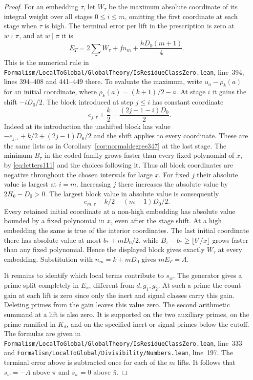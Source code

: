 \documentclass[a4paper,11pt]{article}
\theoremstyle{definition}
\theoremstyle{remark}
\newcommand{\srcloc}[2]{{\small\nolinkurl{#1.lean}}, line~#2}
\numberwithin{equation}{section}
\begin{document}
\begin{proof}
For an embedding \(\tau\), let \(W_\tau\) be the maximum
absolute coordinate of its integral weight over all stages
\(0\le i\le m\), omitting the first coordinate at each stage
when \(\tau\) is high. The terminal error per lift in the
prescription is zero at \(w\nmid\pi\), and at \(w\mid\pi\)
it is
\[
 E_T=2\sum_\tau W_\tau+f n_m+\frac{hD_0(m+1)}4 .
\]
This is the numerical rule in
\srcloc{Formalism/LocalToGlobal/GlobalTheory/IsResidueClassZero}{394},
lines 394--408 and 441--449 there. To evaluate the maximum,
write \(u_a-\rho_k(a)\) for an initial coordinate, where
\(\rho_k(a)=(k+1)/2-a\). At stage \(i\) it gains the shift
\(-iD_0/2\). The block introduced at step \(j\le i\) has
constant coordinate
\[
       -e_{j,\tau}+\frac{k}{2}
                      +\frac{(2j-1-i)D_0}{2}.
\]
Indeed at its introduction the unshifted block has value
\(-e_{j,\tau}+k/2+(2j-1)D_0/2\) and the shift applies to
every coordinate. These are the same lists as in
Corollary~\ref{cor:normaldegree347} at the last stage.
The minimum \(B_\tau\) in the coded family grows faster than
every fixed polynomial of \(x\), by \eqref{eq:letters111} and
the choices following it. Thus all block coordinates are negative
throughout the chosen intervals for large \(x\). For fixed \(j\)
their absolute value is largest at \(i=m\). Increasing \(j\)
there increases the absolute value by \(2H_0-D_0>0\). The
largest block value in absolute value is consequently
\[
                     e_{m,\tau}-k/2-(m-1)D_0/2 .
\]
Every retained initial coordinate at a non-high embedding has
absolute value bounded by a fixed polynomial in \(x\), even
after the stage shift. At a high embedding the same is true of
the interior coordinates. The last initial coordinate there
has absolute value at most \(b_*+mD_0/2\), while
\(B_\tau-b_*\ge\lfloor b'/x\rfloor\) grows faster than any
fixed polynomial. Hence the displayed block gives exactly
\(W_\tau\) at every embedding. Substitution with \(n_m=k+mD_0\)
gives \(m E_T=A\).

It remains to identify which local terms contribute to \(s_w\).
The generator gives a prime split completely in \(E_x\),
different from \(d,g_1,g_2\). At such a prime the count gain
at each lift is zero since only the inert and signal classes
carry this gain. Deleting primes from the gain leaves this
value zero. The second arithmetic summand at a lift is also
zero. It is supported on the two auxiliary primes, on the
prime ramified in \(K_d\), and on the specified inert or
signal primes below the cutoff. The formulas are given in
\srcloc{Formalism/LocalToGlobal/GlobalTheory/IsResidueClassZero}{333}
and \srcloc{Formalism/LocalToGlobal/Divisibility/Numbers}{197}.
The terminal error above is subtracted once for each of the
\(m\) lifts. It follows that \(s_w=-A\) above \(\pi\)
and \(s_w=0\) above \(\bar\pi\).


\end{proof}
\end{document}
